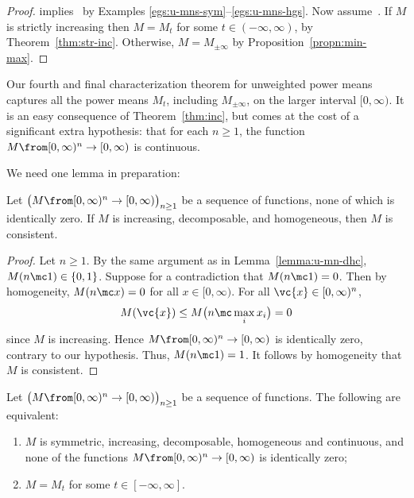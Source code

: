 \begin{proof}
 implies~ by Examples
\ref{egs:u-mns-sym}--\ref{egs:u-mns-hgs}.  Now
assume~.  If $M$ is strictly increasing then $M =
M_t$ for some $t \in (-\infty, \infty)$, by Theorem~\ref{thm:str-inc}.
Otherwise, $M = M_{\pm\infty}$ by Proposition~\ref{propn:min-max}.
\end{proof}

Our fourth and final characterization theorem for unweighted power means
captures all the power means $M_t$, including $M_{\pm\infty}$, on the
larger interval $[0, \infty)$.  It is an easy consequence of
  Theorem~\ref{thm:inc}, but comes at the cost of a significant extra
  hypothesis: that for each $n \geq 1$, the function
  $M \from [0, \infty)^n \to [0, \infty)$ is continuous.

We need one lemma in preparation:

\begin{lemma}
Let $\bigl(M\from [0, \infty)^n \to [0, \infty)\bigr)_{n \geq 1}$ be a
sequence of functions, none of which is identically zero.  If $M$ is
increasing, decomposable, and homogeneous, then $M$ is consistent.
\end{lemma}

\begin{proof}
Let $n \geq 1$.  By the same argument as in Lemma~\ref{lemma:u-mn-dhc}, $M(n
\mc 1) \in \{0, 1\}$.  Suppose for a contradiction that $M(n \mc 1) = 0$.
Then by homogeneity, $M(n \mc x) = 0$ for all $x \in [0, \infty)$.  For all
  $\vc{x} \in [0, \infty)^n$, 
\[
M(\vc{x})
\leq
M\bigl(n \mc \max_i x_i\bigr)
=
0
\]
since $M$ is increasing.  Hence $M \from [0, \infty)^n \to [0, \infty)$ is
identically zero, contrary to our hypothesis.  Thus, $M(n \mc
1) = 1$.  It follows by homogeneity that $M$ is consistent.
\end{proof}

\begin{thm}
\index{power mean!characterization of!unweighted on $[0, \infty)$}
% 
Let $\bigl(M \from [0, \infty)^n \to [0, \infty)\bigr)_{n \geq 1}$ be a
sequence of functions.  The following are equivalent:
% 
\begin{enumerate}
\item
{}
$M$ is symmetric, increasing, decomposable, homogeneous and continuous, and
none of the functions $M \from [0, \infty)^n \to [0, \infty)$ is
identically zero; 

\item
{}
$M = M_t$ for some $t \in [-\infty, \infty]$.
\end{enumerate}
\end{thm}

